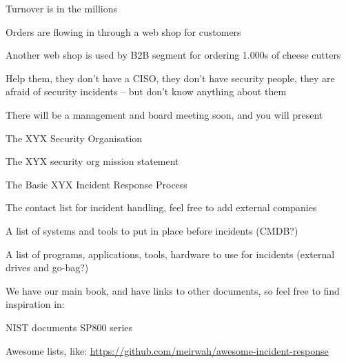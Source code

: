 \documentclass[Screen16to9,17pt]{foils}
\begin{document}
\begin{list2}
\item Turnover is in the millions
\item Orders are flowing in through a web shop for customers
\item Another web shop is used by B2B segment for ordering 1.000s of cheese cutters
\end{list2}

Help them, they don't have a CISO, they don't have security people, they are afraid of security incidents -- but don't know anything about them




There will be a management and board meeting soon, and you will present

\begin{list2}
\item The XYX Security Organisation
\item The XYX security org mission statement
\item The Basic XYX Incident Response Process
\item The contact list for incident handling, feel free to add external companies
\item A list of systems and tools to put in place before incidents (CMDB?)
\item A list of programs, applications, tools, hardware to use for incidents (external drives and go-bag?)
\end{list2}



We have our main book, and have links to other documents, so feel free to find inspiration in:

\begin{list2}
\item NIST documents SP800 series
\item Awesome lists, like: \url{https://github.com/meirwah/awesome-incident-response}
\end{list2}






\end{document}
